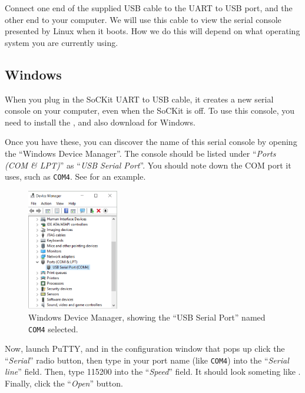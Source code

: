 \documentclass{sockitguide}
\begin{document}
Connect one end of the supplied USB cable to the UART to USB port, and
the other end to your computer. We will use this cable to view the
serial console presented by Linux when it boots. How we do this will
depend on what operating system you are currently using.

\subsection{Windows}

When you plug in the SoCKit UART to USB cable, it creates a new serial
console on your computer, even when the SoCKit is off. To use this
console, you need to install the , and also download
for Windows.

Once you have these, you can discover the name of this serial console
by opening the ``Windows Device Manager''. The console should be
listed under ``\textit{Ports (COM \& LPT)}'' as ``\textit{USB Serial
  Port}''. You should note down the COM port it uses, such as
\texttt{COM4}. See  for an example.

\begin{figure}
  \includegraphics[width=4cm]{figures/devicemanager.png}
  \caption{Windows Device Manager, showing the ``USB Serial Port''
    named \texttt{COM4} selected.}
  \label{fig:devman}
\end{figure}

Now, launch PuTTY, and in the configuration window that pops up click
the ``\textit{Serial}'' radio button, then type in your port name
(like \texttt{COM4}) into the ``\textit{Serial line}'' field. Then,
type \num{115200} into the ``\textit{Speed}'' field. It should look
someting like . Finally, click the ``\textit{Open}''
button.
\end{document}
